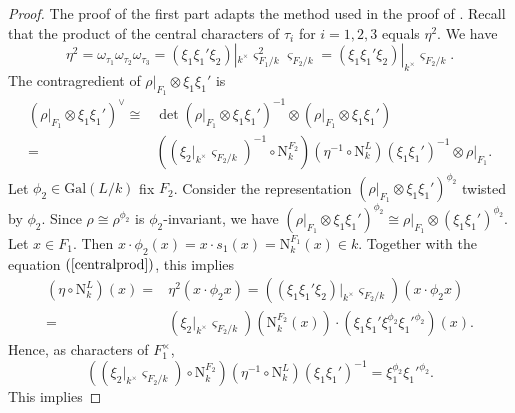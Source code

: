 \documentclass[12pt]{amsart}
\newcommand{\Gal}{{\mathrm{Gal}}}
\newcommand{\N}{{\mathrm{N}}}
\theoremstyle{Theorem}
\theoremstyle{Theorem}
\theoremstyle{Theorem}
\theoremstyle{Theorem}
\theoremstyle{Plain}
\theoremstyle{remark}
\theoremstyle{remark}
\theoremstyle{Definition}
\begin{document}
\begin{proof}
    The proof of the first part adapts the method used in the proof of \cite[Lemma 1.5]{Tunnell}. Recall that the product of the central characters of $\tau_i$ for $ i = 1, 2, 3 $ equals $ \eta^2 $. We have
    \begin{equation}
        \label{centralprod}
        \eta^2 = \omega_{ \tau_1 } \omega_{ \tau_2 } \omega_{ \tau_3 } = \left( \xi_1 \xi_1' \xi_2 \right)|_{ k^\times } \varsigma^2_{ F_1/k } \varsigma_{ F_2/k } = \left( \xi_1 \xi_1' \xi_2 \right)|_{ k^\times } \varsigma_{ F_2/k }.
    \end{equation}       
    The contragredient of $ \rho|_{ F_1 } \otimes \xi_1 \xi_1' $ is
    \[
        \begin{aligned}
            \left( \rho|_{ F_1 } \otimes \xi_1 \xi_1' \right)^\vee
            \cong& \det \left( \rho|_{ F_1 } \otimes \xi_1 \xi_1' \right)^{-1} \otimes \left( \rho|_{ F_1 } \otimes \xi_1 \xi_1' \right)\\
                =& \left( \left( \xi_2|_{ k^\times } \varsigma_{ F_2/k } \right)^{-1} \circ \N^{ F_2 }_k \right) \left( \eta^{-1} \circ \N^{L}_k \right) ( \xi_1 \xi_1' )^{-1} \otimes \rho|_{ F_1 }.
        \end{aligned}
    \]
    Let $ \phi_2 \in \Gal( L/k ) $ fix $ F_2 $. Consider the representation $ \left( \rho|_{ F_1 } \otimes \xi_1 \xi_1' \right)^{ \phi_2 } $ twisted by $\phi_2$. Since $ \rho \cong \rho^{ \phi_2 } $ is $\phi_2$-invariant, we have $ \left( \rho|_{ F_1 } \otimes \xi_1 \xi_1' \right)^{ \phi_2 } \cong \rho|_{ F_1 } \otimes ( \xi_1 \xi_1' )^{ \phi_2 } $. Let $ x \in F_1 $. Then $ x \cdot \phi_2(x) = x \cdot s_1(x) = \N^{ F_1 }_k (x) \in k $. Together with the equation $ (\ref{centralprod}) $, this implies
    \[
        \begin{aligned}
            \left( \eta \circ \N^L_k \right) (x) =& \eta^2 ( x \cdot \phi_2 x ) = \left( \left( \xi_1 \xi_1' \xi_2 \right)|_{ k^\times } \varsigma_{ F_2/k } \right) ( x \cdot \phi_2 x )\\
                                                 =& \left( \xi_2|_{ k^\times } \varsigma_{ F_2/k } \right) \left( \N^{ F_2 }_k (x) \right) \cdot \left( \xi_1 \xi_1' \xi_1^{ \phi_2 } \xi_1'^{ \phi_2 } \right) (x).
        \end{aligned}
    \]
    Hence, as characters of $F_1^\times$,
    \[
        \left( \left( \xi_2|_{ k^\times } \varsigma_{ F_2/k } \right) \circ \N^{ F_2 }_k \right) \left( \eta^{-1} \circ \N^{L}_k \right) ( \xi_1 \xi_1' )^{-1} = \xi_1^{ \phi_2 } \xi_1'^{ \phi_2 }.
    \]
    This implies

\end{proof}
\end{document}
